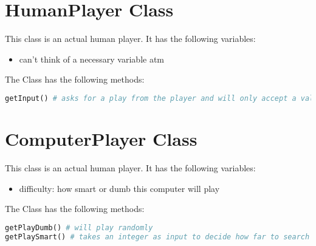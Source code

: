 \documentclass[12pt]{article}
\begin{document}
\section{HumanPlayer Class}

This class is an actual human player. It has the following variables:
\begin{itemize}
  \item can't think of a necessary variable atm
\end{itemize}


The Class has the following methods:
\begin{lstlisting}[language=Python]
getInput() # asks for a play from the player and will only accept a valid response. Will ask again if necessary. 
\end{lstlisting}

\section{ComputerPlayer Class}

This class is an actual human player. It has the following variables:
\begin{itemize}
  \item difficulty: how smart or dumb this computer will play
\end{itemize}


The Class has the following methods:
\begin{lstlisting}[language=Python]
getPlayDumb() # will play randomly
getPlaySmart() # takes an integer as input to decide how far to search with a minmax algorithm
\end{lstlisting}
\end{document}

